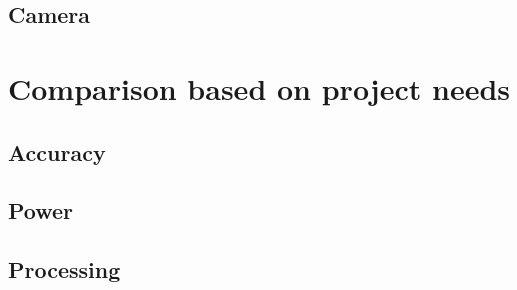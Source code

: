 \documentclass{article}
\begin{document}
\subsection{Camera}


\section{Comparison based on project needs}

\subsection{Accuracy}

\subsection{Power}

\subsection{Processing}



\end{document}
